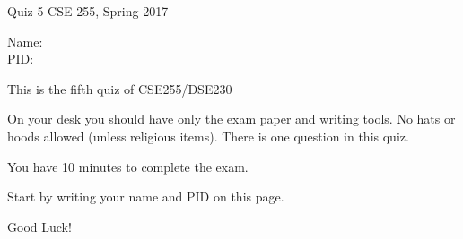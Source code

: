 \documentclass[10pt]{article}
\begin{document}
\setlength\parindent{0pt}
\thispagestyle{empty}

{\textbf \Large Quiz 5} \hfill CSE 255, Spring 2017
\\

\vspace{.1in}

Name: \underline{\hspace{3in}}
\\

PID: \underline{\hspace{3.15in}}

\vspace{.1in}

{\small \setlength\parindent{20pt}This is the fifth quiz of CSE255/DSE230

On your desk you should have only the exam paper and writing tools.
No hats or hoods allowed (unless religious items).
There is one question in this quiz.

You have 10 minutes to complete the exam.

Start by writing your name and PID on this page.

Good Luck!}\\
\underline{\hspace{6in}}
\end{document}
